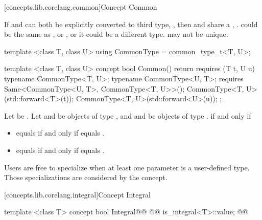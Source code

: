 \begin{addedblock}
[concepts.lib.corelang.common]{Concept Common}

\pnum
If  and  can both be explicitly converted to  third type,
, then  and  share a ,
. \enternote {} could be the same as , or , or
it could be a different type.  may not be unique.\exitnote
{}

%
\begin{itemdecl}
template <class T, class U>
using CommonType = common_type_t<T, U>;

template <class T, class U>
concept bool Common() {
  return requires (T t, U u) {
    typename CommonType<T, U>;
    typename CommonType<U, T>;
    requires Same<CommonType<U, T>, CommonType<T, U>>();
    CommonType<T, U>(std::forward<T>(t));
    CommonType<T, U>(std::forward<U>(u));
  };
}
\end{itemdecl}

\begin{itemdescr}
\pnum
Let  be . Let  and  be objects
of type , and  and  be objects of type .
 if and only if
\begin{itemize}
\item {} equals  if and only if  equals .
\item {} equals  if and only if  equals .
\end{itemize}

\pnum
\enternote Users are free to specialize  when at least one parameter is a
user-defined type. Those specializations are considered by the  concept.\exitnote

\end{itemdescr}

[concepts.lib.corelang.integral]{Concept Integral}

%
\begin{itemdecl}
template <class T>
concept bool Integral@\newtxt{() \{}\oldtxt{ =}@
  @@ is_integral<T>::value;
@\newtxt{\}}@
\end{itemdecl}


\end{addedblock}

